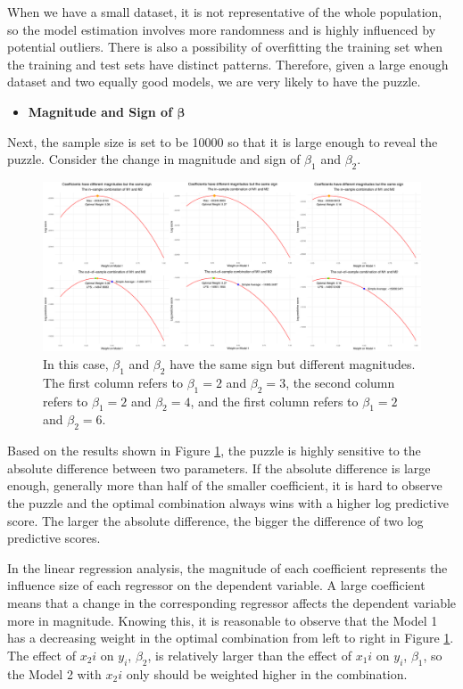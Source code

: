 \documentclass{monashthesis}
\begin{document}
When we have a small dataset, it is not representative of the whole population, so the model estimation involves more randomness and is highly influenced by potential outliers. There is also a possibility of overfitting the training set when the training and test sets have distinct patterns. Therefore, given a large enough dataset and two equally good models, we are very likely to have the puzzle.

\begin{itemize}
\tightlist
\item
  \bf{Magnitude and Sign of $\pmb{\beta}$}
\end{itemize}

Next, the sample size is set to be 10000 so that it is large enough to reveal the puzzle. Consider the change in magnitude and sign of \(\beta_1\) and \(\beta_2\).

\begin{figure}[ht]
\centering
\includegraphics[scale=0.35]{figures/Beta_diff_mag.png}
\caption{In this case, $\beta_1$ and $\beta_2$ have the same sign but different magnitudes. The first column refers to $\beta_1=2$ and $\beta_2=3$, the second column refers to $\beta_1=2$ and $\beta_2=4$, and the first column refers to $\beta_1=2$ and $\beta_2=6$.}
\label{fig:magnitude}
\end{figure}

Based on the results shown in Figure \ref{fig:magnitude}, the puzzle is highly sensitive to the absolute difference between two parameters. If the absolute difference is large enough, generally more than half of the smaller coefficient, it is hard to observe the puzzle and the optimal combination always wins with a higher log predictive score. The larger the absolute difference, the bigger the difference of two log predictive scores.

In the linear regression analysis, the magnitude of each coefficient represents the influence size of each regressor on the dependent variable. A large coefficient means that a change in the corresponding regressor affects the dependent variable more in magnitude. Knowing this, it is reasonable to observe that the Model 1 has a decreasing weight in the optimal combination from left to right in Figure \ref{fig:magnitude}. The effect of \(x_2i\) on \(y_i\), \(\beta_2\), is relatively larger than the effect of \(x_1i\) on \(y_i\), \(\beta_1\), so the Model 2 with \(x_2i\) only should be weighted higher in the combination.
\end{document}
